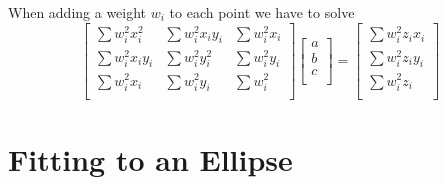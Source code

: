\documentclass[aps]{revtex4}
\begin{document}
When adding a weight $w_i$ to each point we have to solve
\begin{equation}
	\label{eq:circ}
	\begin{bmatrix}
	\sum w_i^2 x_i^2 & \sum w_i^2 x_iy_i & \sum w_i^2 x_i\\
	\sum w_i^2 x_iy_i & \sum w_i^2 y_i^2 & \sum w_i^2 y_i\\
	\sum w_i^2x_i    & \sum w_i^2y_i & \sum w_i^2 \\
	\end{bmatrix}
	\begin{bmatrix}
	a\\
	b\\
	c\\
	\end{bmatrix}
	=
	\begin{bmatrix}
	\sum w_i^2z_i x_i\\
	\sum w_i^2z_i y_i\\
	\sum w_i^2z_i\\
	\end{bmatrix}
\end{equation}



\section{Fitting to an Ellipse}
\end{document}
